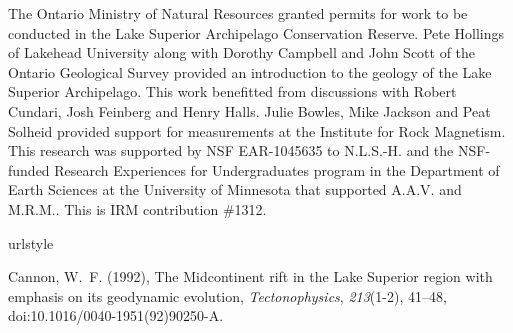 \documentclass[draft,gc]{AGUTeX}
\begin{document}
\begin{article}
\begin{acknowledgments}
The Ontario Ministry of Natural Resources granted permits for work to be conducted in the Lake Superior Archipelago Conservation Reserve. Pete Hollings of Lakehead University along with Dorothy Campbell and John Scott of the Ontario Geological Survey provided an introduction to the geology of the Lake Superior Archipelago. This work benefitted from discussions with Robert Cundari, Josh Feinberg and Henry Halls. Julie Bowles, Mike Jackson and Peat Solheid provided support for measurements at the Institute for Rock Magnetism. This research was supported by NSF EAR-1045635 to N.L.S.-H. and the NSF-funded Research Experiences for Undergraduates program in the Department of Earth Sciences at the University of Minnesota that supported A.A.V. and M.R.M.. This is IRM contribution $\#$1312.

\end{acknowledgments}

%
%
%
%
%
%
%
%
%

%

\begin{thebibliography}{24}
\providecommand{\natexlab}[1]{#1}
\expandafter\ifx\csname urlstyle\endcsname\relax
  \providecommand{\doi}[1]{doi:\discretionary{}{}{}#1}\else
  \providecommand{\doi}{doi:\discretionary{}{}{}\begingroup
  \urlstyle{rm}\Url}\fi

Cannon, W.~F. (1992), The {Midcontinent rift in the Lake Superior} region with
  emphasis on its geodynamic evolution, \textit{Tectonophysics},
  \textit{213}(1-2), 41--48, \doi{10.1016/0040-1951(92)90250-A}.


\end{thebibliography}
\end{article}
\end{document}
